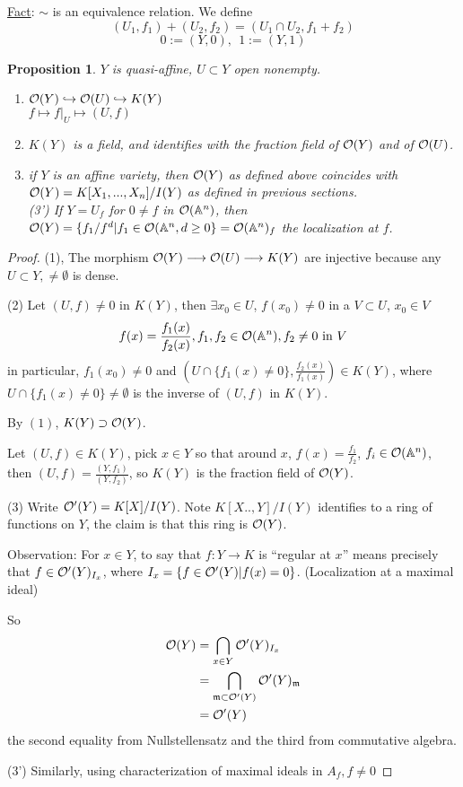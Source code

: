 \documentclass[11pt]{article}
\newtheorem{prop}[thm]{Proposition}
\newcommand{\affn}{\mathbb A}
\newcommand{\scm}{{\mathfrak m}}
\newcommand{\calo}{{\cal O}}
\newcommand{\lrta}{\longrightarrow}
\newcommand{\inj}{\hookrightarrow}
\begin{document}
\underline{Fact}: $\sim$ is an equivalence relation. We define
$$
(U_1,f_1)+(U_2,f_2)=(U_1\cap U_2,f_1+f_2)
$$
$$
0:=(Y,0),\ \ 1:=(Y,1)
$$
\begin{prop}
$Y$ is quasi-affine, $U\subset Y$ open nonempty.
\begin{enumerate}
\item $\calo(Y)\inj\calo(U)\inj K(Y)$\\
$f\longmapsto f|_U\mapsto (U,f)$
\item $K(Y)$ is a field, and identifies with the fraction field of $\calo(Y)$ and of $\calo(U)$.
\item if $Y$ is an affine variety, then $\calo(Y)$ as defined above coincides with $\calo(Y)=K[X_1,...,X_n]/I(Y)$ as defined in previous sections.\\

(3') If $Y=U_f$ for $0\neq f$ in $\calo(\affn^n)$, then $\calo(Y)=\{f_1/f^d|f_1\in \calo(\affn^n, d\geq 0\}=\calo(\affn^n)_f$ the localization at $f$.
\end{enumerate}
\end{prop}
\begin{proof}
(1), The morphism $\calo(Y)\lrta \calo(U)\lrta K(Y)$ are injective because any $U\subset Y,\neq \emptyset$ is dense.

(2) Let $(U,f)\neq 0$ in $K(Y)$, then $\exists x_0\in U$, $f(x_0)\neq 0$ in a $V\subset U$, $x_0\in V$
$$
f(x)=\frac{f_1(x)}{f_2(x)}, f_1,f_2\in\calo(\affn^n), f_2\neq 0\text{ in }V
$$
in particular, $f_1(x_0)\neq 0$ and $( U\cap\{f_1(x)\neq 0\},\frac{f_2(x)}{f_1(x)})\in K(Y)$, where $U\cap\{f_1(x)\neq 0\}\neq \emptyset$ is the inverse of $(U,f)$ in $K(Y)$. 

By $(1)$, $K(Y)\supset \calo(Y)$.

Let $(U,f)\in K(Y)$, pick $x\in Y$ so that around $x$, $f(x)=\frac{f_1}{f_2}$, $f_i\in\calo(\affn^n)$, then $(U,f)=\frac{(Y,f_1)}{(Y,f_2)}$, so $K(Y)$ is the fraction field of $\calo(Y)$.

(3) Write $\calo'(Y)=K[X]/I(Y)$.  Note $K[X..,Y]/I(Y)$ identifies to a ring of functions on $Y$, the claim is that this ring is $\calo(Y)$.

Observation:
For $x\in Y$, to say that $f: Y\lrta K$ is ``regular at $x$'' means precisely that $f\in \calo'(Y)_{I_x}$, where $I_x=\{f\in\calo'(Y)|f(x)=0\}$. (Localization at  a maximal ideal)

So $$
\begin{aligned}
\calo(Y)&=\bigcap_{x\in Y}\calo'(Y)_{I_x}\\
&=\bigcap_{\scm\subset\calo'(Y)}\calo'(Y)_\scm\\
&=\calo'(Y)
\end{aligned}
$$
the second equality from Nullstellensatz and the third from commutative algebra.

(3') Similarly, using characterization of maximal ideals in $A_f, f\neq 0$
\end{proof}
\end{document}
